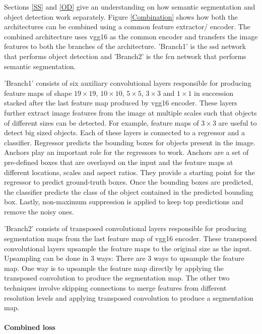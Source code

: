 Sections \ref{SS} and \ref{OD} give an understanding on how semantic segmentation and object detection work separately. Figure \ref{Combination} shows how both the architectures can be combined using a common feature extractor/ encoder. The combined architecture uses \ac{vgg}16 as the common encoder and transfers the image features to both the branches of the architecture. 'Branch1' is the \ac{ssd} network that performs object detection and 'Branch2' is the \ac{fcn} network that performs semantic segmentation. 
\par
'Branch1' consists of six auxiliary convolutional layers responsible for producing feature maps of shape $19\times19$, $10\times10$, $5\times5$, $3\times3$ and $1\times1$ in succession stacked after the last feature map produced by \ac{vgg}16 encoder. These layers further extract image features from the image at multiple scales such that objects of different sizes can be detected. For example, feature maps of $3\times3$ are useful to detect big sized objects. Each of these layers is connected to a regressor and a classifier. Regressor predicts the bounding boxes for objects present in the image. Anchors play an important role for the regressors to work. Anchors are a set of pre-defined boxes that are overlayed on the input and the feature maps at different locations, scales and aspect ratios. They provide a starting point for the regressor to predict ground-truth boxes.  Once the bounding boxes are predicted, the classifier predicts the class of the object contained in the predicted bounding box. Lastly, non-maximum suppression is applied to keep top predictions and remove the noisy ones. 

\par
'Branch2' consists of transposed convolutional layers responsible for producing segmentation maps from the last feature map of \ac{vgg}16 encoder. These transposed convolutional layers upsample the feature maps to the original size as the input. Upsampling can be done in 3 ways: 
There are 3 ways to upsample the feature map. One way is to upsample the feature map directly by applying the transposed convolution to produce the segmentation map. The other two techniques involve skipping connections to merge features from different resolution levels and applying transposed convolution to produce a segmentation map.   


\paragraph{Combined loss} \label{combineloss}

